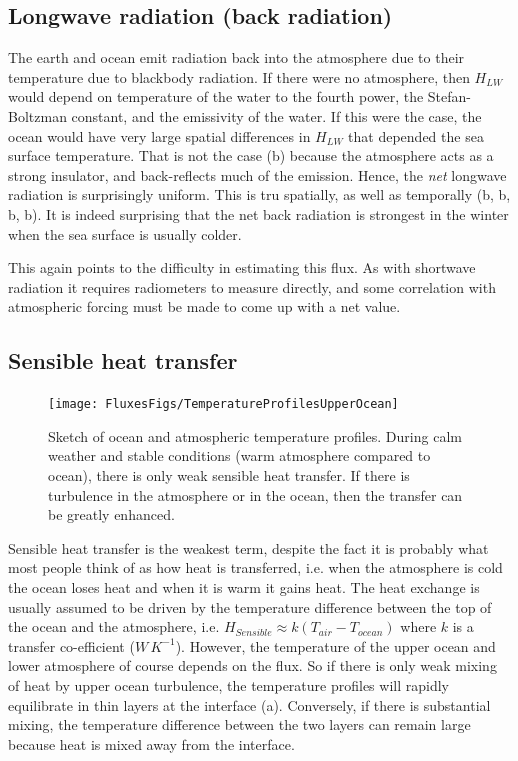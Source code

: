 \subsection{Longwave radiation (back radiation)}

The earth and ocean emit radiation back into the atmosphere due to their temperature due to blackbody radiation.  If there were no atmosphere, then $H_{LW}$ would depend on temperature of the water to the fourth power, the Stefan-Boltzman constant, and the emissivity of the water.  If this were the case, the ocean would have very large spatial differences in $H_{LW}$ that depended the sea surface temperature.  That is not the case (b) because the atmosphere acts as a strong insulator, and back-reflects much of the emission.  Hence, the \emph{net} longwave radiation is surprisingly uniform.  This is tru spatially, as well as temporally  (b, b, b, b).  It is indeed surprising that the net back radiation is strongest in the winter when the sea surface is usually colder.

This again points to the difficulty in estimating this flux.  As with shortwave radiation it requires radiometers to measure directly, and some correlation with atmospheric forcing must be made to come up with a net value.

\subsection{Sensible heat transfer}

\begin{figure}[htb]
\texttt{[image: FluxesFigs/TemperatureProfilesUpperOcean]}
 \caption{Sketch of ocean and atmospheric temperature profiles.  During calm weather and stable conditions (warm atmosphere compared to ocean), there is only weak sensible heat transfer.  If there is turbulence in the atmosphere or in the ocean, then the transfer can be greatly enhanced.}
  \label{fig:TemperatureProfilesUpperOcean}
\end{figure}

Sensible heat transfer is the weakest term, despite the fact it is probably what most people think of as how heat is transferred, i.e. when the atmosphere is cold  the ocean loses heat and when it is warm it gains heat.  The heat exchange is usually assumed to be driven by the temperature difference between the top of the ocean and the atmosphere, i.e. $H_{Sensible} \approx k \left(T_{air} - T_{ocean}\right)$ where $k$ is a transfer co-efficient ($W\, K^{-1}$).  However, the temperature of the upper ocean and lower atmosphere of course depends on the flux. So if there is only weak mixing of heat by upper ocean turbulence, the temperature profiles will rapidly equilibrate in thin layers at the interface (a).  Conversely, if there is substantial mixing, the temperature difference between the two layers can remain large because heat is mixed away from the interface.  

